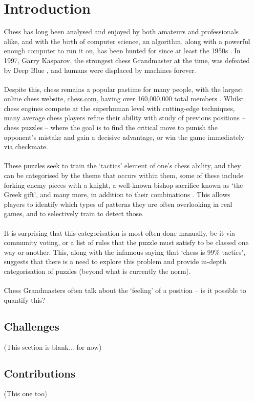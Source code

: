 \chapter{Introduction}
    Chess has long been analysed and enjoyed by both amateurs and professionals 
    alike, and with the birth of computer science, an algorithm, along with
    a powerful enough computer to run it on, has been hunted for since at least the
    1950s \cite{shannon}. In 1997, Garry Kasparov, the strongest chess 
    Grandmaster at the time, was defeated by Deep Blue \cite{deepBlue}, and 
    humans were displaced by machines forever. 
    \\~\\
    Despite this, chess remains a popular pastime for many people, with the 
    largest online chess website, \url{chess.com}, having over 160,000,000 total
    members \cite{chesscomMembers}. Whilst chess engines compete at the superhuman 
    level with cutting-edge
    techniques, many average chess players refine their ability with study of
    previous positions -- chess puzzles -- where the goal is to find the critical
    move to punish the opponent's mistake and gain a decisive advantage, or 
    win the game immediately via checkmate. 
    \\~\\
    These puzzles seek to train the `tactics' element of one's chess ability, 
    and they can be categorised by the theme that occurs within them, some of 
    these include forking enemy pieces with a knight, a well-known bishop
    sacrifice known as `the Greek gift', and many more, in addition to their
    combinations \cite{chessPatterns}. This allows players to identify which
    types of patterns they are often overlooking in real games, and to selectively
    train to detect those. 
    \\~\\
    It is surprising that this categorisation is most often done manually, be it
    via community voting, or a list of rules that the puzzle must satisfy to be
    classed one way or another. This, along with the infamous saying that `chess
    is 99\% tactics', suggests that there is a need to explore this problem and
    provide in-depth categorisation of puzzles (beyond what is currently the norm).
    \\~\\
    Chess Grandmasters often talk about the `feeling' of a position -- is it 
    possible to quantify this?
\section{Challenges}
(This section is blank... for now)
\section{Contributions}
(This one too)